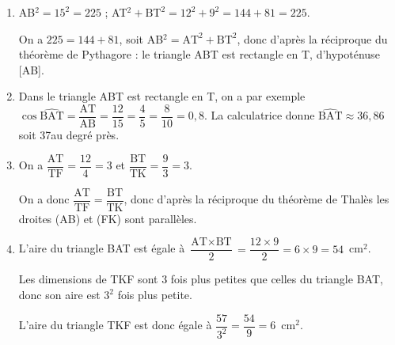 
\bigskip

%
% 
\begin{enumerate}
\item AB$^2 = 15^2 = 225$ ; AT$^2 + \text{BT}^2 = 12^2 + 9^2 = 144 + 81 = 225$.

On a $225 = 144 + 81$, soit AB$^2 = \text{AT}^2 + \text{BT}^2$, donc d'après la réciproque du théorème de Pythagore : le triangle ABT est rectangle en T, d'hypoténuse [AB].
\item Dans le triangle ABT est rectangle en T, on a par exemple $\cos \widehat{\text{BAT}} = \dfrac{\text{AT}}{\text{AB}} = \dfrac{12}{15} = \dfrac{4}{5} = \dfrac{8}{10} = 0,8$. La calculatrice donne $\widehat{\text{BAT}} \approx 36,86$ soit 37\degres au degré près.
\item On a $\dfrac{\text{AT}}{\text{TF}} = \dfrac{12}{4} = 3$ et $\dfrac{\text{BT}}{\text{TK}} = \dfrac{9}{3} = 3$.

On a donc $\dfrac{\text{AT}}{\text{TF}} = \dfrac{\text{BT}}{\text{TK}}$, donc d'après la réciproque du théorème de Thalès les droites (AB) et (FK) sont parallèles.
\item L'aire du triangle BAT est égale à  $\dfrac{\text{AT} \times \text{BT}}{2} = \dfrac{12 \times 9}{2} = 6 \times 9 =  54$~cm$^2$.

Les dimensions de TKF sont 3 fois plus petites que celles du triangle BAT, donc son aire est $3^2$ fois plus petite. 

L'aire du triangle TKF est donc égale à  $\dfrac{57}{3^2} = \dfrac{54}{9} = 6$~cm$^2$.
\end{enumerate}
\bigskip
 
